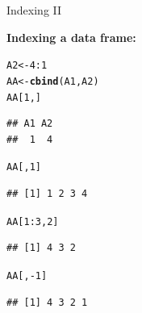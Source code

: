 \documentclass[11pt,german,hideothersubsections]{beamer}\usepackage[]{graphicx}\usepackage[]{color}
\makeatletter
\newcommand{\hlnum}[1]{\textcolor[rgb]{0.686,0.059,0.569}{#1}}%
\newcommand{\hlopt}[1]{\textcolor[rgb]{0,0,0}{#1}}%
\newcommand{\hlstd}[1]{\textcolor[rgb]{0.345,0.345,0.345}{#1}}%
\newcommand{\hlkwb}[1]{\textcolor[rgb]{0.69,0.353,0.396}{#1}}%
\newcommand{\hlkwd}[1]{\textcolor[rgb]{0.737,0.353,0.396}{\textbf{#1}}}%
\newenvironment{kframe}{%
 \def\at@end@of@kframe{}%
 \ifinner\ifhmode%
  \def\at@end@of@kframe{\end{minipage}}%
  \begin{minipage}{\columnwidth}%
 \fi\fi%
 \def\FrameCommand##1{\hskip\@totalleftmargin \hskip-\fboxsep
 \colorbox{shadecolor}{##1}\hskip-\fboxsep
     \hskip-\linewidth \hskip-\@totalleftmargin \hskip\columnwidth}%
 \MakeFramed {\advance\hsize-\width
   \@totalleftmargin\z@ \linewidth\hsize
   \@setminipage}}%
 {\par\unskip\endMakeFramed%
 \at@end@of@kframe}
\newenvironment{knitrout}{}{} %
\makeatother
\begin{document}
\begin{frame}[fragile]{Indexing II}
\begin{center}
\textbf{Indexing a data frame:}
\end{center}
\begin{knitrout}
\color{fgcolor}\begin{kframe}
\begin{alltt}
\hlstd{A2}\hlkwb{<-}\hlnum{4}\hlopt{:}\hlnum{1}
\hlstd{AA}\hlkwb{<-}\hlkwd{cbind}\hlstd{(A1,A2)}
\hlstd{AA[}\hlnum{1}\hlstd{,]}
\end{alltt}
\begin{verbatim}
## A1 A2 
##  1  4
\end{verbatim}
\begin{alltt}
\hlstd{AA[,}\hlnum{1}\hlstd{]}
\end{alltt}
\begin{verbatim}
## [1] 1 2 3 4
\end{verbatim}
\begin{alltt}
\hlstd{AA[}\hlnum{1}\hlopt{:}\hlnum{3}\hlstd{,}\hlnum{2}\hlstd{]}
\end{alltt}
\begin{verbatim}
## [1] 4 3 2
\end{verbatim}
\begin{alltt}
\hlstd{AA[,}\hlopt{-}\hlnum{1}\hlstd{]}
\end{alltt}
\begin{verbatim}
## [1] 4 3 2 1
\end{verbatim}
\end{kframe}
\end{knitrout}
\end{frame}
\end{document}
